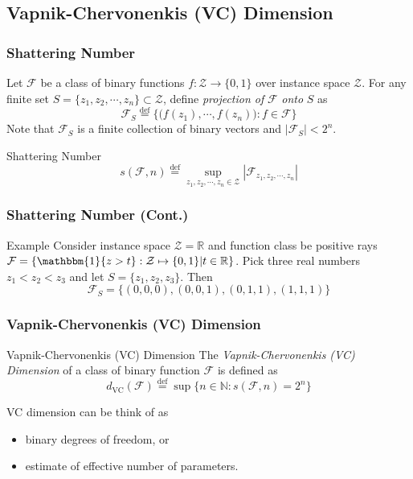 \documentclass{beamer}
\begin{document}
\subsection{Vapnik-Chervonenkis (VC) Dimension} 
\begin{frame}
\frametitle{Shattering Number} 

Let $\mathcal{F}$ be a class of binary functions $f: \mathcal{Z} \rightarrow \{0,1\}$ over instance space $\mathcal{Z}$. For any finite set $S = \{z_1, z_2, \cdots, z_n\} \subset \mathcal{Z}$, define \textit{projection of} $\mathcal{F}$ \textit{onto} $S$ as 
$$ \mathcal{F}_{S} \stackrel{\text{def}}{=} \bigg\{ \big( f(z_1), \cdots, f(z_n) \big): f \in \mathcal{F} \bigg\}  $$
Note that $\mathcal{F}_{S}$ is a finite collection of binary vectors and $|\mathcal{F}_{S}| < 2^n$. 

\begin{block}{Shattering Number}
$$ s(\mathcal{F}, n) \stackrel{\text{def}}{=} \sup_{z_1, z_2, \cdots, z_n \in \mathcal{Z}} |\mathcal{F}_{z_1, z_2, \cdots, z_n}| $$
\end{block}

\end{frame}


\begin{frame}
\frametitle{Shattering Number (Cont.)} 

\begin{block}{Example}
Consider instance space $\mathcal{Z} = \mathbb{R}$ and function class be positive rays $\mathcal{F} = \{\mathbbm{1}\{z > t\}: \mathcal{Z} \mapsto \{0,1\} | t \in \mathbb{R} \}$. Pick three real numbers $z_1 < z_2 < z_3$ and let $S = \{z_1, z_2, z_3\}$. Then 
$$ \mathcal{F}_{S} = \{ (0, 0, 0), (0, 0, 1), (0, 1, 1), (1, 1, 1) \} $$
\end{block}

\end{frame}


\begin{frame}
\frametitle{Vapnik-Chervonenkis (VC) Dimension} 

\begin{block}{Vapnik-Chervonenkis (VC) Dimension}
The \textit{Vapnik-Chervonenkis (VC) Dimension} of a class of binary function $\mathcal{F}$ is defined as 
$$ d_{\text{VC}}(\mathcal{F}) \stackrel{\text{def}}{=} \sup \big\{ n \in \mathbb{N}: s(\mathcal{F}, n) = 2^n \big\} $$
\end{block}

VC dimension can be think of as 
\begin{itemize}
    \item binary degrees of freedom, or 
    \item estimate of effective number of parameters. 
\end{itemize}

\end{frame}
\end{document}
